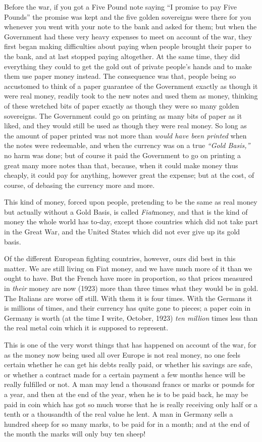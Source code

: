 \documentclass{book}
\begin{document}
Before the war, if you got a Five Pound note saying “I promise to pay Five Pounds” the promise was kept and the five golden sovereigns were there for you whenever you went with your note to the bank and asked for them; but when the Government had these very heavy expenses to meet on account of the war, they first began making difficulties about paying when people brought their paper to the bank, and at last stopped paying altogether. At the same time, they did everything they could to get the gold out of private people’s hands and to make them use paper money instead. The consequence was that, people being so accustomed to think of a paper guarantee of the Government exactly as though it were real money, readily took to the new notes and used them as money, thinking of these wretched bits of paper exactly as though they were so many golden sovereigns. The Government could go on printing as many bits of paper as it liked, and they would still be used as though they were real money. So long as the amount of paper printed was not more than \emph{would have been printed} when the notes were redeemable, and when the currency was on a true \emph{“Gold Basis,”} no harm was done; but of course it paid the Government to go on printing a great many more notes than that, because, when it could make money thus cheaply, it could pay for anything, however great the expense; but at the cost, of course, of debasing the currency more and more.

This kind of money, forced upon people, pretending to be the same as real money but actually without a Gold Basis, is called \emph{Fiat}\footnotemark[1] money, and that is the kind of money the whole world has to-day, except those countries which did not take part in the Great War, and the United States which did not ever give up its gold basis.

Of the different European fighting countries, however, ours did best in this matter. We are still living on Fiat money, and we have much more of it than we ought to have. But the French have more in proportion, so that prices measured in \emph{their} money are now (1923) more than three times what they would be in gold. The Italians are worse off still. With them it is four times. With the Germans it is millions of times, and their currency has quite gone to pieces; a paper coin in Germany is worth (at the time I write, October, 1923) \emph{ten million} times less than the real metal coin which it is supposed to represent.

This is one of the very worst things that has happened on account of the war, for as the money now being used all over Europe is not real money, no one feels certain whether he can get his debts really paid, or whether his savings are safe, or whether a contract made for a certain payment a few months hence will be really fulfilled or not. A man may lend a thousand francs or marks or pounds for a year, and then at the end of the year, when he is to be paid back, he may be paid in coin which has got so much worse that he is really receiving only half or a tenth or a thousandth of the real value he lent. A man in Germany sells a hundred sheep for so many marks, to be paid for in a month; and at the end of the month the marks will only buy ten sheep!
\end{document}
